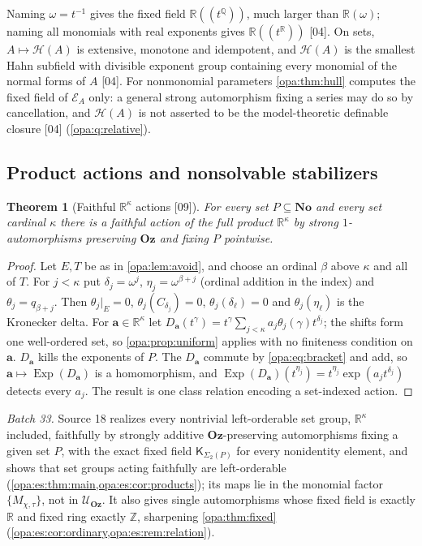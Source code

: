 \documentclass[11pt,oneside]{article}
\numberwithin{equation}{section}
\newtheorem{theorem}{Theorem}[section]
\theoremstyle{definition}
\theoremstyle{remark}
\newcommand{\No}{\mathbf{No}}
\newcommand{\Oz}{\mathbf{Oz}}
\newcommand{\R}{\mathbb R}
\newcommand{\Q}{\mathbb Q}
\newcommand{\Z}{\mathbb Z}
\newcommand{\UU}{\mathcal U}
\newcommand{\EE}{\mathcal E}
\newcommand{\HH}{\mathcal H}
\newcommand{\Exp}{\operatorname{Exp}}
\newcommand{\Hahn}[2]{#1((t^{#2}))}
\newcommand{\src}[1]{\textup{\textsf{\small[#1]}}}
\begin{document}
Naming $\omega=t^{-1}$ gives the fixed field $\Hahn\R\Q$, much larger than
$\R(\omega)$; naming all monomials with real exponents gives $\Hahn\R\R$ \src{04}.
On sets, $A\mapsto\HH(A)$ is extensive, monotone and idempotent, and $\HH(A)$ is
the smallest Hahn subfield with divisible exponent group containing every
monomial of the normal forms of $A$ \src{04}. For nonmonomial parameters
\cref{opa:thm:hull} computes the fixed field of $\EE_A$ only: a general strong
automorphism fixing a series may do so by cancellation, and $\HH(A)$ is not
asserted to be the model-theoretic definable closure \src{04}
(\cref{opa:q:relative}).

\subsection{Product actions and nonsolvable stabilizers}

\begin{theorem}[Faithful $\R^\kappa$ actions \src{09}]\label{opa:thm:product}
For every set $P\subseteq\No$ and every set cardinal $\kappa$ there is a faithful
action of the full product $\R^\kappa$ by strong $1$-automorphisms preserving
$\Oz$ and fixing $P$ pointwise.
\end{theorem}
\begin{proof}
Let $E,T$ be as in \cref{opa:lem:avoid}, and choose an ordinal $\beta$ above
$\kappa$ and all of $T$. For $j<\kappa$ put $\delta_j=\omega^j$,
$\eta_j=\omega^{\beta+j}$ (ordinal addition in the index) and $\theta_j=q_{\beta+j}$.
Then $\theta_j|_E=0$, $\theta_j(C_{\delta_j})=0$, $\theta_j(\delta_\ell)=0$ and
$\theta_j(\eta_\ell)$ is the Kronecker delta. For $\mathbf a\in\R^\kappa$ let
$D_{\mathbf a}(t^\gamma)=t^\gamma\sum_{j<\kappa}a_j\theta_j(\gamma)t^{\delta_j}$; the shifts
form one well-ordered set, so \cref{opa:prop:uniform} applies with no finiteness
condition on $\mathbf a$. $D_{\mathbf a}$ kills the exponents of $P$. The
$D_{\mathbf a}$ commute by \eqref{opa:eq:bracket} and add, so
$\mathbf a\mapsto\Exp(D_{\mathbf a})$ is a homomorphism, and
$\Exp(D_{\mathbf a})(t^{\eta_j})=t^{\eta_j}\exp(a_jt^{\delta_j})$ detects every $a_j$.
The result is one class relation encoding a set-indexed action.
\end{proof}

\emph{Batch 33.} Source 18 realizes every nontrivial left-orderable set group, $\R^\kappa$
included, faithfully by strongly additive $\Oz$-preserving automorphisms fixing a given
set $P$, with the exact fixed field $\mathsf K_{\Sigma_2(P)}$ for every nonidentity element,
and shows that set groups acting faithfully are left-orderable
(\cref{opa:es:thm:main,opa:es:cor:products}); its maps lie in the monomial factor
$\{M_{\chi,\tau}\}$, not in $\UU_\Oz$. It also gives single automorphisms whose fixed field
is exactly $\R$ and fixed ring exactly $\Z$, sharpening \cref{opa:thm:fixed}
(\cref{opa:es:cor:ordinary,opa:es:rem:relation}).
\end{document}

